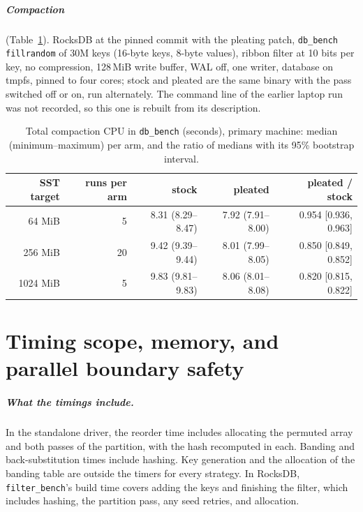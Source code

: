 \documentclass[a4paper,UKenglish,cleveref,autoref,thm-restate,anonymous]{lipics-v2021}
\begin{document}
\subparagraph*{Compaction} (Table~\ref{tab:esevencomp}). RocksDB at the pinned commit with the
pleating patch, \texttt{db\_bench} \texttt{fillrandom} of 30M keys (16-byte keys, 8-byte values),
ribbon filter at 10 bits per key, no compression, 128\,MiB write buffer, WAL off, one writer,
database on tmpfs, pinned to four cores; stock and pleated are the same binary with the pass
switched off or on, run alternately. The command line of the earlier laptop run was not
recorded, so this one is rebuilt from its description.

\begin{table}
\caption{Total compaction CPU in \texttt{db\_bench} (seconds), primary machine: median
(minimum--maximum) per arm, and the ratio of medians with its 95\% bootstrap interval.}
\label{tab:esevencomp}
\small\setlength{\tabcolsep}{4pt}
\begin{tabular}{rrrrr}
\toprule
SST target & runs per arm & stock & pleated & pleated / stock \\
\midrule
64 MiB & 5 & 8.31 (8.29--8.47) & 7.92 (7.91--8.00) & 0.954 [0.936, 0.963] \\
256 MiB & 20 & 9.42 (9.39--9.44) & 8.01 (7.99--8.05) & 0.850 [0.849, 0.852] \\
1024 MiB & 5 & 9.83 (9.81--9.83) & 8.06 (8.01--8.08) & 0.820 [0.815, 0.822] \\
\bottomrule
\end{tabular}
\end{table}

\section{Timing scope, memory, and parallel boundary safety}\label{app:scope}
\subparagraph*{What the timings include.} In the standalone driver, the reorder time includes allocating
the permuted array and both passes of the partition, with the hash recomputed in each. Banding and
back-substitution times include hashing. Key generation and the allocation of the banding table are
outside the timers for every strategy. In RocksDB, \texttt{filter\_bench}'s build time covers adding
the keys and finishing the filter, which includes hashing, the partition pass, any seed retries, and
allocation.
\end{document}

